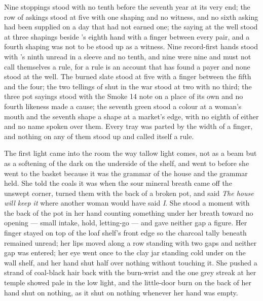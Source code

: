 Nine stoppings stood with no tenth before the seventh year at its very end; the row of askings stood at five with one shaping and no witness, and no sixth asking had been supplied on a day that had not earned one; the saying at the well stood at three shapings beside 's eighth hand with a finger between every pair, and a fourth shaping was not to be stood up as a witness. Nine record-first hands stood with 's ninth unread in a sleeve and no tenth, and nine were nine and must not call themselves a rule, for a rule is an account that has found a payer and none stood at the well. The burned slate stood at five with a finger between the fifth and the four; the two tellings of  shut in the war stood at two with no third; the three pot sayings stood with the Smoke 14 note on a place of its own and no fourth likeness made a cause; the seventh green stood a colour at a woman's mouth and the seventh shape a shape at a market's edge, with no eighth of either and no name spoken over them. Every tray was parted by the width of a finger, and nothing on any of them stood up and called itself a rule.

The first light came into the room the way tallow light comes, not as a beam but as a softening of the dark on the underside of the shelf, and  went to  before she went to the basket because it was the grammar of the house and the grammar held. She told the coals it was  when the sour mineral breath came off the unswept corner, turned them with the back of a broken pot, and said \emph{The house will keep it} where another woman would have said \emph{I}. She stood a moment with the back of the pot in her hand counting something under her breath toward no opening --- small intake, hold, letting-go --- and gave neither gap a figure. Her finger stayed on top of the loaf shelf's front edge so the charcoal tally beneath remained unread; her lips moved along a row standing with two gaps and neither gap was entered; her eye went once to the clay jar standing cold under  on the wall shelf, and her hand shut half over nothing without touching it. She pushed a strand of coal-black hair back with the burn-wrist and the one grey streak at her temple showed pale in the low light, and the little-door burn on the back of her hand shut on nothing, as it shut on nothing whenever her hand was empty.

